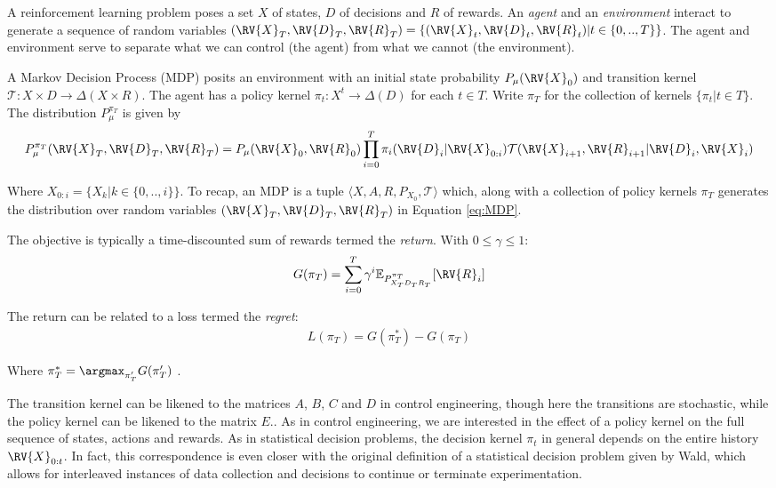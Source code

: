 A reinforcement learning problem poses a set $X$ of states, $D$ of decisions and $R$ of rewards. An \emph{agent} and an \emph{environment} interact to generate a sequence of random variables $(\RV{X}_T,\RV{D}_T,\RV{R}_T)=\{(\RV{X}_t, \RV{D}_t, \RV{R}_t)|t\in\{0,..,T\}\}$. The agent and environment serve to separate what we can control (the agent) from what we cannot (the environment). 

A Markov Decision Process (MDP) posits an environment with an initial state probability $P_\mu(\RV{X}_0)$ and transition kernel $\mathcal{T}:X\times D\to \Delta(X\times R)$. The agent has a policy kernel $\pi_t:X^t\to \Delta(D)$ for each $t\in T$. Write $\pi_T$ for the collection of kernels $\{\pi_t|t\in T\}$. The distribution $P^{\pi_T}_\mu$ is given by
\begin{align}
    P^{\pi_T}_\mu(\RV{X}_T,\RV{D}_T,\RV{R}_T)=P_\mu(\RV{X}_0,\RV{R}_0)\prod_{i=0}^T \pi_i(\RV{D}_i|\RV{X}_{0:i})\mathcal{T}(\RV{X}_{i+1},\RV{R}_{i+1}|\RV{D}_i,\RV{X}_i) \label{eq:MDP}
\end{align}

Where $X_{0:i}=\{X_k|k\in\{0,..,i\}\}$. To recap, an MDP is a tuple $\langle X,A,R,P_{X_0},\mathcal{T}\rangle$ which, along with a collection of policy kernels $\pi_T$ generates the distribution over random variables $(\RV{X}_T,\RV{D}_T,\RV{R}_T)$ in Equation \ref{eq:MDP}.

The objective is typically a time-discounted sum of rewards termed the \emph{return}. With $0\leq \gamma \leq 1$:
\begin{align}
    G(\pi_T) = \sum_{i=0}^T \gamma^i \mathbb{E}_{P^{\pi_T}_{X_TD_TR_T}}[\RV{R}_i]
\end{align}

The return can be related to a loss termed the \emph{regret}:
\begin{align}
    L(\pi_T) = G(\pi^*_T) - G(\pi_T)
\end{align}

Where $\pi^*_T=\argmax_{\pi'_T}G(\pi'_T)$ \cite{barto_reinforcement_1998}.

The transition kernel can be likened to the matrices $A$, $B$, $C$ and $D$ in control engineering, though here the transitions are stochastic, while the policy kernel can be likened to the matrix $E$.. As in control engineering, we are interested in the effect of a policy kernel on the full sequence of states, actions and rewards. As in statistical decision problems, the decision kernel $\pi_t$ in general depends on the entire history $\RV{X}_{0:t}$. In fact, this correspondence is even closer with the original definition of a statistical decision problem given by Wald, which allows for interleaved instances of data collection and decisions to continue or terminate experimentation\cite{wald1950statistical}.

